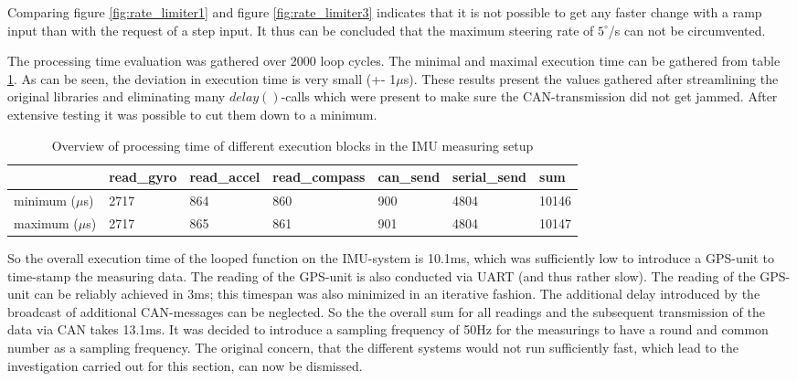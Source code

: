 \documentclass[ExampleMasters.tex]{subfiles}
\begin{document}
Comparing figure \ref{fig:rate_limiter1} and figure \ref{fig:rate_limiter3} indicates that it is not possible to get any faster change with a ramp input than with the request of a step input. It thus can be concluded that the maximum steering rate of $5^\circ $/s can not be circumvented.

The processing time evaluation was gathered over 2000 loop cycles. The minimal and maximal execution time can be gathered from table \ref{tab:execution_time}. As can be seen, the deviation in execution time is very small (+- 1$\mu$s). These results present the values gathered after streamlining the original libraries and eliminating many $delay()$-calls which were present to make sure the \gls{CAN}-transmission did not get jammed. After extensive testing it was possible to cut them down to a minimum. 

\begin{table}[h]
	\centering
	\caption{Overview of processing time of different execution blocks in the \acrshort{IMU} measuring setup}
	\label{tab:execution_time}
	\begin{tabular}{l|llllll}
		& read\_gyro & read\_accel & read\_compass & can\_send & serial\_send & sum   \\ \hline 
		minimum ($\mu$s) & 2717       & 864         & 860           & 900       & 4804         & 10146 \\
		maximum ($\mu$s) & 2717       & 865         & 861           & 901       & 4804         & 10147
	\end{tabular}
\end{table}

So the overall execution time of the looped function on the \gls{IMU}-system is 10.1ms, which was sufficiently low to introduce a \gls{GPS}-unit to time-stamp the measuring data. The reading of the \gls{GPS}-unit is also conducted via UART (and thus rather slow). The reading of the \gls{GPS}-unit can be reliably achieved in 3ms; this timespan was also minimized in an iterative fashion. The additional delay introduced by the broadcast of additional \gls{CAN}-messages can be neglected. So the the overall sum for all readings and the subsequent transmission of the data via \gls{CAN} takes 13.1ms. It was decided to introduce a sampling frequency of 50Hz for the measurings to have a round and common number as a sampling frequency.  
The original concern, that the different systems would not run sufficiently fast, which lead to the investigation carried out for this section, can now be dismissed.
\end{document}
